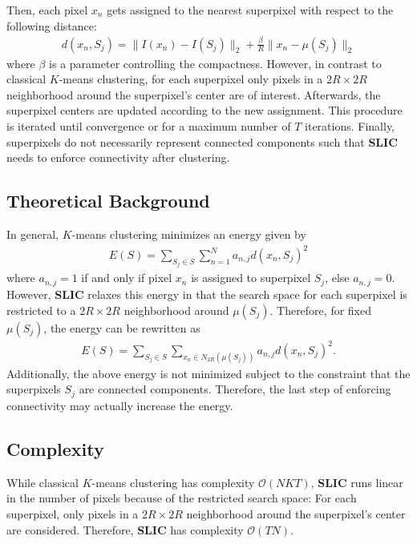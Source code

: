 Then, each pixel $x_n$ gets assigned to the nearest superpixel with respect to the following distance:
\begin{align}
	\label{eq:superpixel-segmentation-slic-distance}
	d(x_n, S_j) = \|I(x_n) - I(S_j)\|_2 + \frac{\beta}{R} \|x_n - \mu(S_j)\|_2
\end{align}
where $\beta$ is a parameter controlling the compactness. However, in contrast to classical $K$-means clustering, for each superpixel only pixels in a $2R \times 2R$ neighborhood around the superpixel's center are of interest. Afterwards, the superpixel centers are updated according to the new assignment. This procedure is iterated until convergence or for a maximum number of $T$ iterations. Finally, superpixels do not necessarily represent connected components such that \textbf{SLIC} needs to enforce connectivity after clustering.

\subsection{Theoretical Background}

In general, $K$-means clustering minimizes an energy given by
\begin{align}
	\label{eq:superpixel-segmentation-slic-objective}
	E(S) = \sum_{S_j \in S} \sum_{n = 1}^N a_{n,j} d(x_n, S_j)^2
\end{align}
where $a_{n,j} = 1$ if and only if pixel $x_n$ is assigned to superpixel $S_j$, else $a_{n,j} = 0$. However, \textbf{SLIC} relaxes this energy in that the search space for each superpixel is restricted to a $2R \times 2R$ neighborhood around $\mu(S_j)$. Therefore, for fixed $\mu(S_j)$, the energy can be rewritten as
\begin{align}
	E(S) = \sum_{S_j \in S} \sum_{x_n \in N_{2R}(\mu(S_j))} a_{n,j} d(x_n, S_j)^2.
\end{align}
Additionally, the above energy is not minimized subject to the constraint that the superpixels $S_j$ are connected components. Therefore, the last step of enforcing connectivity may actually increase the energy.

\subsection{Complexity}

While classical $K$-means clustering has complexity $\mathcal{O}(NKT)$, \textbf{SLIC} runs linear in the number of pixels because of the restricted search space: For each superpixel, only pixels in a $2R \times 2R$ neighborhood around the superpixel's center are considered. Therefore, \textbf{SLIC} has complexity $\mathcal{O}(TN)$.

